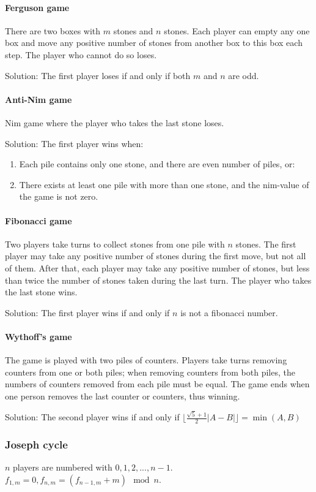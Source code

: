 \paragraph{Ferguson game}
There are two boxes with $m$ stones and $n$ stones. Each player can empty any one box and move any positive number of stones from another box to this box each step. The player who cannot do so loses. 

Solution: The first player loses if and only if both $m$ and $n$ are odd.

\paragraph{Anti-Nim game}
Nim game where the player who takes the last stone loses.

Solution: The first player wins when:
\begin{enumerate}
\item Each pile contains only one stone, and there are even number of piles, or:
\item There exists at least one pile with more than one stone, and the nim-value of the game is not zero.
\end{enumerate}

\paragraph{Fibonacci game}
Two players take turns to collect stones from one pile with $n$ stones. The first player may take any positive number of stones during the first move, but not all of them. After that, each player may take any positive number of stones, but less than twice the number of stones taken during the last turn. The player who takes the last stone wins.

Solution: The first player wins if and only if $n$ is not a fibonacci number.

\paragraph{Wythoff's game}
The game is played with two piles of counters. Players take turns removing counters from one or both piles; when removing counters from both piles, the numbers of counters removed from each pile must be equal. The game ends when one person removes the last counter or counters, thus winning.

Solution: The second player wins if and only if $\lfloor \frac{\sqrt{5}+1}{2}|A-B| \rfloor=\min(A,B)$

\subsubsection{Joseph cycle}
$n$ players are numbered with $0,1,2,...,n-1$. $f_{1,m}=0,f_{n,m}=(f_{n-1,m}+m)\mod n$. 

